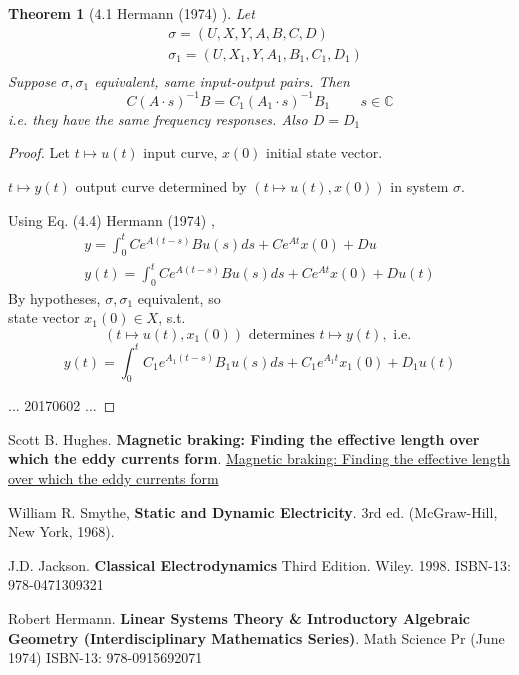 \documentclass[10pt]{amsart}
\newtheorem{theorem}{Theorem}
\begin{document}
\begin{multicols*}{2}
\begin{theorem}[4.1 Hermann (1974) \cite{Herm1974}]
Let 
\[
\begin{aligned}
&	\sigma = (U,X,Y,A,B,C,D) \\ 
&	\sigma_1 = (U,X_1,Y,A_1,B_1,C_1,D_1) \\ 
\end{aligned}
\]
Suppose $\sigma,\sigma_1$ equivalent, same input-output pairs.  Then
\begin{equation}
	C(A\cdot s)^{-1}B = C_1(A_1\cdot s)^{-1}B_1 \qquad \, s \in \mathbb{C}
\end{equation}
i.e. they have the same frequency responses.  Also $D=D_1$
\end{theorem}

\begin{proof}
Let $t \mapsto u(t)$ input curve, $x(0)$ initial state vector.  

$t\mapsto y(t)$ output curve determined by $(t\mapsto u(t), x(0))$ in system $\sigma$.  

Using Eq. (4.4) Hermann (1974) \cite{Herm1974}, 
\begin{equation}
\begin{gathered}
	y = \int_0^t Ce^{A(t-s) } Bu(s) ds + Ce^{At} x(0) + Du \\ 
y(t) = \int_0^t Ce^{A(t-s)} Bu(s) ds + Ce^{At } x(0) + Du(t) 
\end{gathered}
\end{equation}
By hypotheses, $\sigma,\sigma_1$ equivalent, so  \\

state vector $x_1(0) \in X$, s.t.
\[
(t\mapsto u(t), x_1(0)) \text{ determines } t\mapsto y(t), \text{ i.e. } 
\]
\[
y(t) = \int_0^t C_1 e^{A_1(t-s) } B_1u(s) ds + C_1 e^{A_1t } x_1(0) + D_1u(t)
\]

... 20170602 ...

\end{proof}





\end{multicols*}

\begin{thebibliography}{9}


Scott B. Hughes.  \textbf{Magnetic braking: Finding the effective length over which the eddy currents form}.  
\href{https://drive.google.com/file/d/0Bwo3W0v5P04LX29XT2NFeVY0a1E/view}{Magnetic braking: Finding the effective length over which the eddy currents form}  


William R. Smythe, \textbf{Static and Dynamic Electricity}.  3rd ed. (McGraw-Hill, New York, 1968).  

J.D. Jackson.  \textbf{Classical Electrodynamics} Third Edition.  Wiley.  1998.   ISBN-13: 978-0471309321

Robert Hermann.  \textbf{Linear Systems Theory \& Introductory Algebraic Geometry (Interdisciplinary Mathematics Series)}.  Math Science Pr (June 1974)
ISBN-13: 978-0915692071

\end{thebibliography}
\end{document}
